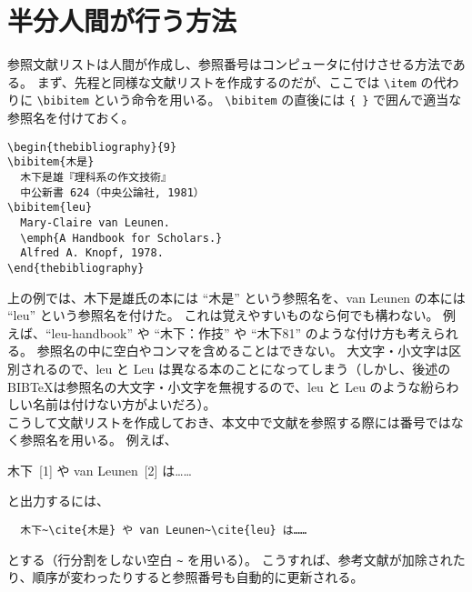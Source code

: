 \section{半分人間が行う方法}
参照文献リストは人間が作成し、参照番号はコンピュータに付けさせる方法である。
まず、先程と同様な文献リストを作成するのだが、ここでは \verb'\item' の代わりに \verb'\bibitem' という命令を用いる。
\verb'\bibitem' の直後には \verb'{ }' で囲んで適当な参照名を付けておく。
\begin{mdframed}[roundcorner=0.50zw,leftmargin=3.00zw,rightmargin=3.00zw,skipabove=0.40zw,skipbelow=0.40zw,innertopmargin=4.00pt,innerbottommargin=4.00pt,innerleftmargin=5.00pt,innerrightmargin=5.00pt,linecolor=gray!020,linewidth=0.50pt,backgroundcolor=gray!20]
\begin{verbatim}
\begin{thebibliography}{9}
\bibitem{木是}
  木下是雄『理科系の作文技術』
  中公新書 624（中央公論社, 1981）
\bibitem{leu}
  Mary-Claire van Leunen.
  \emph{A Handbook for Scholars.}
  Alfred A. Knopf, 1978.
\end{thebibliography}
\end{verbatim}
\end{mdframed}
上の例では、木下是雄{\small 氏}の本には ``木是'' という参照名を、van Leunen の本には ``leu'' という参照名を付けた。
これは覚えやすいものなら何でも構わない。
例えば、``leu-handbook'' や ``木下：作技'' や ``木下81'' のような付け方も考えられる。
参照名の中に空白やコンマを含めることはできない。
大文字・小文字は区別されるので、leu と Leu は異なる本のことになってしまう（しかし、後述の B{\scriptsize IB}\hspc{-1.50pt}\TeX{}は参照名の大文字・小文字を無視するので、leu と Leu のような紛らわしい名前は付けない方がよいだろ）。\\

こうして文献リストを作成しておき、本文中で文献を参照する際には番号ではなく参照名を用いる。
例えば、
\begin{mdframed}[roundcorner=0.50zw,leftmargin=3.00zw,rightmargin=3.00zw,skipabove=0.40zw,skipbelow=0.40zw,innertopmargin=4.00pt,innerbottommargin=4.00pt,innerleftmargin=5.00pt,innerrightmargin=5.00pt,linecolor=gray!100,linewidth=0.50pt,backgroundcolor=gray!00]
  木下~[1] や van Leunen~[2] は……
\end{mdframed}
と出力するには、
\begin{mdframed}[roundcorner=0.50zw,leftmargin=3.00zw,rightmargin=3.00zw,skipabove=0.40zw,skipbelow=0.40zw,innertopmargin=4.00pt,innerbottommargin=4.00pt,innerleftmargin=5.00pt,innerrightmargin=5.00pt,linecolor=gray!020,linewidth=0.50pt,backgroundcolor=gray!20]
\begin{verbatim}
  木下~\cite{木是} や van Leunen~\cite{leu} は……
\end{verbatim}
\end{mdframed}
とする（行分割をしない空白 \verb'~' を用いる）。
こうすれば、参考文献が加除されたり、順序が変わったりすると参照番号も自動的に更新される。\\

